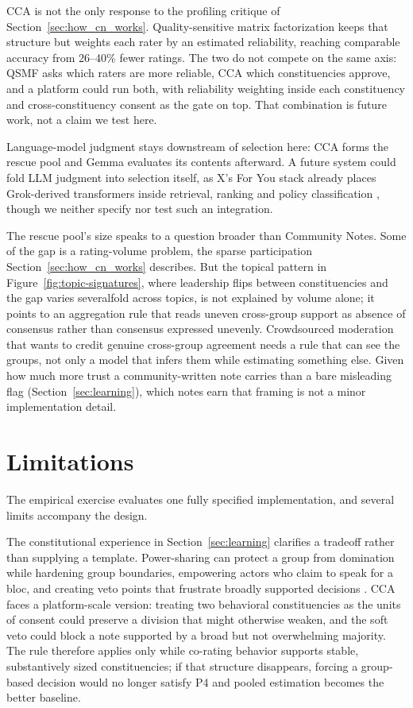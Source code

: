 \documentclass[10pt,twocolumn]{article}
\begin{document}
CCA is not the only response to the profiling critique of
Section~\ref{sec:how_cn_works}. Quality-sensitive matrix factorization
\citep{goyal2026qsmf} keeps that structure but weights each rater by an
estimated reliability, reaching comparable accuracy from 26--40\% fewer ratings.
The two do not compete on the same axis: QSMF asks which raters are more
reliable, CCA which constituencies approve, and a platform could run both, with
reliability weighting inside each constituency and cross-constituency consent as
the gate on top. That combination is future work, not a claim we test here.

Language-model judgment stays downstream of selection here: CCA forms the
rescue pool and Gemma evaluates its contents afterward. A future system could
fold LLM judgment into selection itself, as X's For You stack already places
Grok-derived transformers inside retrieval, ranking and policy classification
\citep{xai2026algorithm}, though we neither specify nor test such an
integration.

The rescue pool's size speaks to a question broader than Community Notes. Some
of the gap is a rating-volume problem, the sparse participation
Section~\ref{sec:how_cn_works} describes. But the topical pattern in
Figure~\ref{fig:topic-signatures}, where leadership flips between
constituencies and the gap varies severalfold across topics, is not explained by
volume alone; it points to an aggregation rule that reads uneven cross-group
support as absence of consensus rather than consensus expressed unevenly.
Crowdsourced moderation that wants to credit genuine cross-group agreement needs
a rule that can see the groups, not only a model that infers them while
estimating something else. Given how much more trust a community-written note
carries than a bare misleading flag (Section~\ref{sec:learning}), which notes
earn that framing is not a minor implementation detail.

\section{Limitations}
\label{sec:limitations}

The empirical exercise evaluates one fully specified implementation, and
several limits accompany the design.

The constitutional experience in Section~\ref{sec:learning} clarifies a
tradeoff rather than supplying a template. Power-sharing can protect a group
from domination while hardening group boundaries, empowering actors who claim to
speak for a bloc, and creating veto points that frustrate broadly supported
decisions \citep{mcgarryoleary2009,schwartz2010,mcculloch2025}. CCA faces a
platform-scale version: treating two behavioral constituencies as the units of
consent could preserve a division that might otherwise weaken, and the soft veto
could block a note supported by a broad but not overwhelming majority. The rule
therefore applies only while co-rating behavior supports stable, substantively
sized constituencies; if that structure disappears, forcing a group-based
decision would no longer satisfy P4 and pooled estimation becomes the better
baseline.
\end{document}
